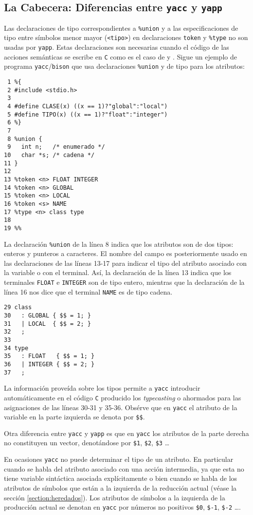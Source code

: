 \subsection{La Cabecera: Diferencias entre {\tt yacc} y {\tt yapp}}
\label{subsection:cabecerayaccyapp}
Las declaraciones de tipo
correspondientes a \verb|%union| y a las especificaciones de 
tipo entre símbolos menor mayor (\verb|<tipo>|) en declaraciones \verb|token| y 
\verb|%type| no son usadas por \verb|yapp|. Estas declaraciones son
necesarias cuando el código de las acciones semánticas
se escribe en \verb|C| como es el caso de  y .
Sigue un ejemplo de programa \verb|yacc|/\verb|bison| que usa declaraciones \verb|%union|
y de tipo para los atributos:

\begin{verbatim}
 1 %{
 2 #include <stdio.h>
 3 
 4 #define CLASE(x) ((x == 1)?"global":"local")
 5 #define TIPO(x) ((x == 1)?"float":"integer")
 6 %}
 7 
 8 %union {
 9   int n;   /* enumerado */
10   char *s; /* cadena */
11 }
12 
13 %token <n> FLOAT INTEGER 
14 %token <n> GLOBAL 
15 %token <n> LOCAL 
16 %token <s> NAME
17 %type <n> class type
18 
19 %%
\end{verbatim}
La declaración \verb|%union| de la línea 8 indica que los atributos
son de dos tipos: enteros y punteros a caracteres. 
El nombre del campo es posteriormente usado en las 
declaraciones de las líneas 13-17 para indicar el tipo 
del atributo asociado con la variable o con el terminal.
Así, la declaración de la línea 13 indica 
que los terminales \verb|FLOAT| e \verb|INTEGER|
son de tipo entero, mientras que la declaración de la línea 16 nos
dice que el terminal \verb|NAME| es de tipo cadena.
\begin{verbatim}
29 class
30   : GLOBAL { $$ = 1; }
31   | LOCAL  { $$ = 2; }
32   ;
33 
34 type
35   : FLOAT   { $$ = 1; }
36   | INTEGER { $$ = 2; }
37   ;
\end{verbatim}
La información proveída sobre los tipos permite a \verb|yacc| 
introducir automáticamente en el código \verb|C| producido 
los \emph{typecasting} o ahormados
para las asignaciones de las líneas 30-31 y 35-36. Obsérve que
en \verb|yacc| el atributo de la variable en la parte izquierda
se denota por \verb|$$|.

Otra diferencia entre \verb|yacc| y \verb|yapp| es que en \verb|yacc| los 
atributos de la parte derecha no constituyen un vector, denotándose
por \verb|$1|, \verb|$2|, \verb|$3| \ldots 

En ocasiones \verb|yacc| no puede determinar el tipo de un atributo. 
En particular cuando se habla del atributo asociado con una acción
intermedia, ya que esta no tiene variable sintáctica asociada 
explícitamente o bien cuando se habla de los atributos
de símbolos que están a la izquierda de la reducción actual
(véase la sección \ref{section:heredados}). Los atributos de símbolos 
a la izquierda de la producción actual se denotan en \verb|yacc| por números 
no positivos \verb|$0|, \verb|$-1|, \verb|$-2| \ldots. 


